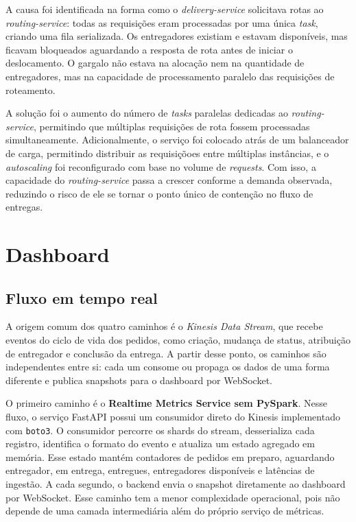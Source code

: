 ﻿\documentclass{article}
\begin{document}
A causa foi identificada na forma como o \textit{delivery-service} solicitava rotas ao \textit{routing-service}: todas as requisições eram processadas por uma única \textit{task}, criando uma fila serializada. Os entregadores existiam e estavam disponíveis, mas ficavam bloqueados aguardando a resposta de rota antes de iniciar o deslocamento. O gargalo não estava na alocação nem na quantidade de entregadores, mas na capacidade de processamento paralelo das requisições de roteamento.

A solução foi o aumento do número de \textit{tasks} paralelas dedicadas ao \textit{routing-service}, permitindo que múltiplas requisições de rota fossem processadas simultaneamente. Adicionalmente, o serviço foi colocado atrás de um balanceador de carga, permitindo distribuir as requisiçõoes entre múltiplas instâncias, e o \textit{autoscaling} foi reconfigurado com base no volume de \textit{requests}. Com isso, a capacidade do \textit{routing-service} passa a crescer conforme a demanda observada, reduzindo o risco de ele se tornar o ponto único de contenção no fluxo de entregas.

\section{Dashboard}
\subsection{Fluxo em tempo real}

A origem comum dos quatro caminhos \'e o \textit{Kinesis Data Stream}, que recebe eventos do ciclo de vida dos pedidos, como cria\c{c}\~ao, mudan\c{c}a de status, atribui\c{c}\~ao de entregador e conclus\~ao da entrega. A partir desse ponto, os caminhos s\~ao independentes entre si: cada um consome ou propaga os dados de uma forma diferente e publica snapshots para o dashboard por WebSocket.

O primeiro caminho \'e o \textbf{Realtime Metrics Service sem PySpark}. Nesse fluxo, o servi\c{c}o FastAPI possui um consumidor direto do Kinesis implementado com \texttt{boto3}. O consumidor percorre os shards do stream, desserializa cada registro, identifica o formato do evento e atualiza um estado agregado em mem\'oria. Esse estado mant\'em contadores de pedidos em preparo, aguardando entregador, em entrega, entregues, entregadores dispon\'iveis e lat\^encias de ingest\~ao. A cada segundo, o backend envia o snapshot diretamente ao dashboard por WebSocket. Esse caminho tem a menor complexidade operacional, pois n\~ao depende de uma camada intermedi\'aria al\'em do pr\'oprio servi\c{c}o de m\'etricas.
\end{document}
